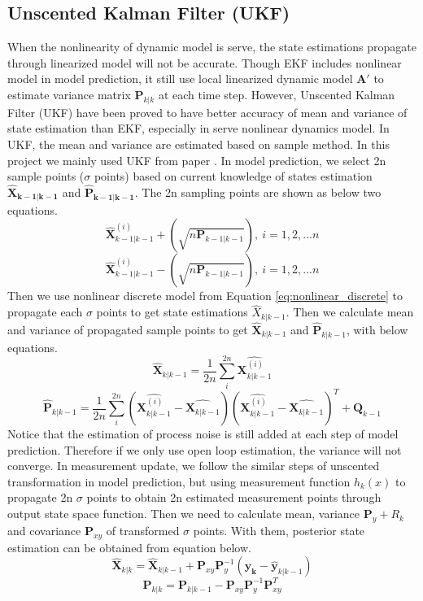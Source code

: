 \documentclass{article}
\newcommand{\matr}[1]{\bm{#1}}     %
\begin{document}
\subsection{Unscented Kalman Filter (UKF)}
When the nonlinearity of dynamic model is serve, the state estimations propagate through linearized model will not be accurate. Though EKF includes nonlinear model in model prediction, it still use local linearized dynamic model ${\matr{A}'}$ to estimate variance matrix $\matr{P}_{k|k}$ at each time step. However, Unscented Kalman Filter (UKF) have been proved to have better accuracy of mean and variance of state estimation than EKF, especially in serve nonlinear dynamics model. In UKF, the mean and variance are estimated based on sample method. In this project we mainly used UKF from paper \cite{moireau2011reduced}. In model prediction, we select 2n sample points ($\sigma$ points) based on current knowledge of states estimation $\matr{\hat{X}_{k-1|k-1}}$ and $\matr{\hat{P}_{k-1|k-1}}$. The 2n sampling points are shown as below two equations.
\begin{equation}
	\hat{\matr{X}}^{(i)}_{k-1|k-1}+(\sqrt{n\matr{P}_{k-1|k-1}}),\  i=1,2,...n
\end{equation}
\begin{equation}
 \hat{\matr{X}}^{(i)}_{k-1|k-1}-(\sqrt{n\matr{P}_{k-1|k-1}}),\  i=1,2,...n
\end{equation}
Then we use nonlinear discrete model from Equation \ref{eq:nonlinear_discrete} to propagate each $\sigma$ points to get state estimations $\hat{X}_{k|k-1}$. Then we calculate mean and variance of propagated sample points to get $\hat{\matr{X}}_{k|k-1}$ and $\hat{\matr{P}}_{k|k-1}$, with below equations.
\begin{equation}
 \hat{\matr{X}}_{k|k-1}=\frac{1}{2n}\sum_{i}^{2n}\hat{\matr{X}^{(i)}_{k|k-1}}
\end{equation}
\begin{equation}
\hat{\matr{P}}_{k|k-1}=\frac{1}{2n}\sum_{i}^{2n}(\hat{\matr{X}^{(i)}_{k|k-1}}-\hat{\matr{X}_{k|k-1}})(\hat{\matr{X}^{(i)}_{k|k-1}}-\hat{\matr{X}_{k|k-1}})^T + \matr{Q}_{k-1}
\end{equation}
Notice that the estimation of process noise is still added at each step of model prediction. Therefore if we only use open loop estimation, the variance will not converge. In measurement update, we follow the similar steps of unscented transformation in model prediction, but using measurement function $h_k(x)$ to propagate 2n $\sigma$ points to obtain 2n estimated measurement points through output state space function. Then we need to calculate mean, variance $\matr{P}_y+R_k$ and covariance $\matr{P}_{xy}$ of transformed $\sigma$ points. With them, posterior state estimation can be obtained from equation below.
\begin{equation}
	\hat{\matr{X}}_{k|k} = 	\hat{\matr{X}}_{k|k-1} + \matr{P}_{xy} \matr{P}^{-1}_{y}(\matr{y_k}-\hat{\matr{y}}_{k|k-1})
\end{equation}
\begin{equation}
	\matr{P}_{k|k}=	\matr{P}_{k|k-1} - \matr{P}_{xy}\matr{P}^{-1}_{y}\matr{P}_{xy}^T
\end{equation}
\end{document}
